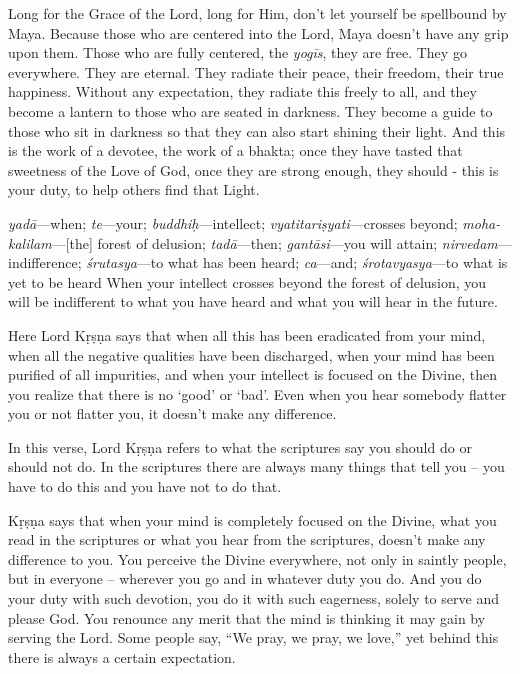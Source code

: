 Long for the Grace of the Lord, long for Him, don’t let yourself be spellbound by Maya. Because those who are centered into the Lord, Maya doesn’t have any grip upon them. Those who are fully centered, the \textit{yogīs}, they are free. They go everywhere. They are eternal. They radiate their peace, their freedom, their true happiness. Without any expectation, they radiate this freely to all, and they become a lantern to those who are seated in darkness. They become a guide to those who sit in darkness so that they can also start shining their light. And this is the work of a devotee, the work of a bhakta; once they have tasted that sweetness of the Love of God, once they are strong enough, they should - this is your duty, to help others find that Light.

{%
  \textit{yadā}---when; 
  \textit{te}---your; 
  \textit{buddhiḥ}---intellect; 
  \textit{vyatitariṣyati}---crosses beyond; 
  \textit{moha-kalilam}---[the] forest of delusion; 
  \textit{tadā}---then; 
  \textit{gantāsi}---you will attain; 
  \textit{nirvedam}---indifference; 
  \textit{śrutasya}---to what has been heard; 
  \textit{ca}---and; 
  \textit{śrotavyasya}---to what is yet to be heard
}
{%
  When your intellect crosses beyond the forest of delusion, you will be indifferent to what you have heard and what you will hear in the future.
}

Here Lord Kṛṣṇa says that when all this has been eradicated from your mind, when all the negative qualities have been discharged, when your mind has been purified of all impurities, and when your intellect is focused on the Divine, then you realize that there is no ‘good’ or ‘bad’. Even when you hear somebody flatter you or not flatter you, it doesn’t make any difference.

In this verse, Lord Kṛṣṇa refers to what the scriptures say you should do or should not do. In the scriptures there are always many things that tell you – you have to do this and you have not to do that.

Kṛṣṇa says that when your mind is completely focused on the Divine, what you read in the scriptures or what you hear from the scriptures, doesn’t make any difference to you. You perceive the Divine everywhere, not only in saintly people, but in everyone – wherever you go and in whatever duty you do. And you do your duty with such devotion, you do it with such eagerness, solely to serve and please God. You renounce any merit that the mind is thinking it may gain by serving the Lord. Some people say, “We pray, we pray, we love,” yet behind this there is always a certain expectation.


